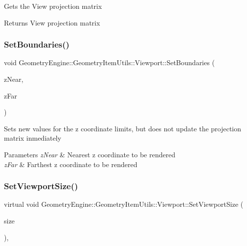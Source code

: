 Gets the View projection matrix \begin{DoxyReturn}{Returns}
View projection matrix 
\end{DoxyReturn}
\mbox{\label{class_geometry_engine_1_1_geometry_item_utils_1_1_viewport_a9500d8b22395ee3f94611881ea89b0aa}} 
\subsubsection{\texorpdfstring{SetBoundaries()}{SetBoundaries()}}
{\footnotesize\ttfamily void Geometry\+Engine\+::\+Geometry\+Item\+Utils\+::\+Viewport\+::\+Set\+Boundaries (\begin{DoxyParamCaption}\item[{G\+Ldouble}]{z\+Near,  }\item[{G\+Ldouble}]{z\+Far }\end{DoxyParamCaption})\hspace{0.3cm}{\ttfamily [inline]}}

Sets new values for the z coordinate limits, but does not update the projection matrix inmediately 
\begin{DoxyParams}{Parameters}
{\em z\+Near} & Nearest z coordinate to be rendered \\
\hline
{\em z\+Far} & Farthest z coordinate to be rendered \\
\hline
\end{DoxyParams}
\mbox{\label{class_geometry_engine_1_1_geometry_item_utils_1_1_viewport_aee56ad377f9615e64c33bdef3d05c94f}} 
\subsubsection{\texorpdfstring{SetViewportSize()}{SetViewportSize()}}
{\footnotesize\ttfamily virtual void Geometry\+Engine\+::\+Geometry\+Item\+Utils\+::\+Viewport\+::\+Set\+Viewport\+Size (\begin{DoxyParamCaption}\item[{const Q\+Vector4D \&}]{size }\end{DoxyParamCaption})\hspace{0.3cm}{\ttfamily [inline]}, {\ttfamily [virtual]}}

